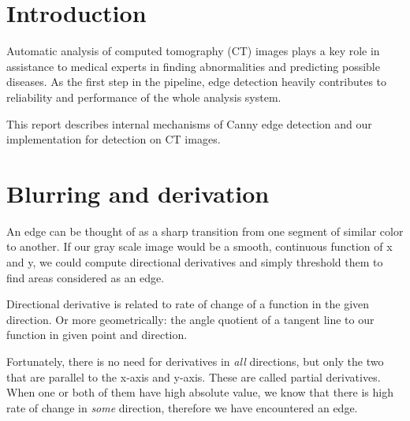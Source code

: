 \documentclass[fleqn,moreauthors,10pt]{ds_report}
\affiliation{\textsuperscript{1}\textit{ae4664@student.uni-lj.si, 63160011}}
\begin{document}
\flushbottom

\maketitle

\thispagestyle{empty}


\section*{Introduction}
	
Automatic analysis of computed tomography (CT) images plays a key role in assistance to medical experts in finding abnormalities and predicting possible diseases. As the first step in the pipeline, edge detection heavily contributes to reliability and performance of the whole analysis system.

This report describes internal mechanisms of Canny edge detection and our implementation for detection on CT images.


\section*{Blurring and derivation}

An edge can be thought of as a sharp transition from one segment of similar color to another. If our gray scale image would be a smooth, continuous function of x and y, we could compute directional derivatives and simply threshold them to find areas considered as an edge.

Directional derivative is related to rate of change of a function in the given direction. Or more geometrically: the angle quotient of a tangent line to our function in given point and direction.

Fortunately, there is no need for derivatives in \textit{all} directions, but only the two that are parallel to the x-axis and y-axis. These are called partial derivatives. When one or both of them have high absolute value, we know that there is high rate of change in \textit{some} direction, therefore we have encountered an edge.
\end{document}
